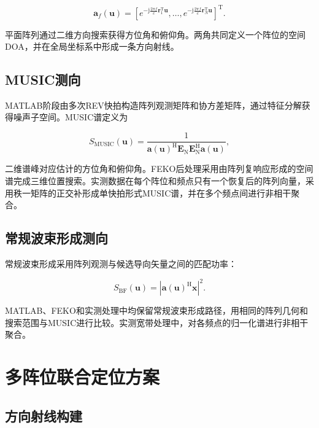 \documentclass[UTF8,a4paper,12pt]{ctexart}
\newcommand{\vect}[1]{\boldsymbol{#1}}
\begin{document}
\begin{equation}
  \vect a_f(\vect u)=
  \left[
    e^{-\mathrm{j}\frac{2\pi f}{c}\vect r_1^{\mathrm T}\vect u},\ldots,
    e^{-\mathrm{j}\frac{2\pi f}{c}\vect r_N^{\mathrm T}\vect u}
  \right]^{\mathrm T}.
\end{equation}

平面阵列通过二维方向搜索获得方位角和俯仰角。两角共同定义一个阵位的空间DOA，并在全局坐标系中形成一条方向射线。

\subsection{MUSIC测向}

MATLAB阶段由多次REV快拍构造阵列观测矩阵和协方差矩阵，通过特征分解获得噪声子空间。MUSIC谱定义为

\begin{equation}
  S_{\mathrm{MUSIC}}(\vect u)=
  \frac{1}{\vect a(\vect u)^{\mathrm H}\vect E_{\mathrm N}\vect E_{\mathrm N}^{\mathrm H}\vect a(\vect u)},
\end{equation}

二维谱峰对应估计的方位角和俯仰角。FEKO后处理采用由阵列复响应形成的空间谱完成三维位置搜索。实测数据在每个阵位和频点只有一个恢复后的阵列向量，采用秩一矩阵的正交补形成单快拍形式MUSIC谱，并在多个频点间进行非相干聚合。

\subsection{常规波束形成测向}

常规波束形成采用阵列观测与候选导向矢量之间的匹配功率：

\begin{equation}
  S_{\mathrm{BF}}(\vect u)=\left|\vect a(\vect u)^{\mathrm H}\vect x\right|^2.
\end{equation}

MATLAB、FEKO和实测处理中均保留常规波束形成路径，用相同的阵列几何和搜索范围与MUSIC进行比较。实测宽带处理中，对各频点的归一化谱进行非相干聚合。

\section{多阵位联合定位方案}

\subsection{方向射线构建}
\end{document}
